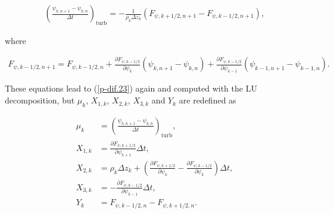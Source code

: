 \begin{eqnarray} \left(\frac{\psi_{k,n+1}-\psi_{k,n}}{\Delta t}\right)_{\text{turb}} = -\frac{1}{\rho_k\Delta z_k}\left(F_{\psi,k+1/2,n+1}-F_{\psi,k-1/2,n+1}\right), \end{eqnarray}

where

\begin{eqnarray} F_{\psi,k-1/2,n+1} = F_{\psi,k-1/2,n} + \frac{\partial F_{\psi,k-1/2}}{\partial \psi_k}(\psi_{k,n+1}-\psi_{k,n}) +  \frac{\partial F_{\psi,k-1/2}}{\partial \psi_{k-1}}(\psi_{k-1,n+1}-\psi_{k-1,n}). \end{eqnarray}

These equations lead to (\ref{p-dif.23}) again and computed with
the LU decomposition, but \(\mu_k\), \(X_{1,k}\), \(X_{2,k}\),
\(X_{3,k}\) and \(Y_k\) are redefined as

\begin{align}
 \mu_k &= \left(\frac{\psi_{k,n+1}-\psi_{k,n}}{\Delta t}\right)_{\text{turb}}, \\
 X_{1,k} &= \frac{\partial F_{\psi,k+1/2}}{\partial \psi_{k+1}} \Delta t, \\
 X_{2,k} &= \rho_k \Delta z_k + \left( \frac{\partial F_{\psi,k+1/2}}{\partial \psi_k} - \frac{\partial F_{\psi,k-1/2}}{\partial \psi_k} \right)\Delta t, \\
 X_{3,k} &= -\frac{\partial F_{\psi,k-1/2}}{\partial \psi_{k-1}} \Delta t, \\
 Y_k &= F_{\psi,k-1/2,n} - F_{\psi,k+1/2,n}.
\end{align}
